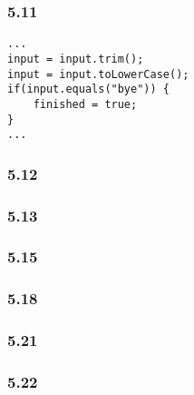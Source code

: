 \subsubsection{5.11}
\begin{lstlisting}
...
input = input.trim();
input = input.toLowerCase();
if(input.equals("bye")) {
    finished = true;
}
...
\end{lstlisting}

\subsubsection{5.12}

\subsubsection{5.13}

\subsubsection{5.15}

\subsubsection{5.18}

\subsubsection{5.21}

\subsubsection{5.22}

